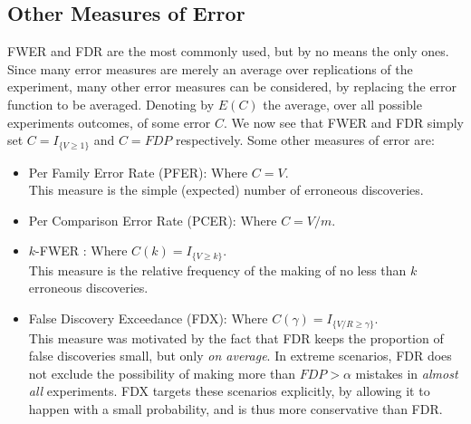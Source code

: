 \documentclass[review,12pt]{article}
\begin{document}
\subsection{\label{sec:other_measures}Other Measures of Error}
FWER and FDR are the most commonly used, but by no means the only ones. Since many error measures are merely an average over replications of the experiment, many other error measures can be considered, by replacing the error function to be averaged. Denoting by $E(C)$ the average, over all possible experiments outcomes, of some error $C$. We now see that FWER and FDR simply set  $C = I_{\{ V \geq 1 \} } $ and $C = FDP$ respectively.
Some other measures of error are:



\begin{itemize}

\item Per Family Error Rate (PFER): Where $C=V$.\\
This measure is the simple (expected) number of erroneous discoveries. 

\item Per Comparison Error Rate (PCER): Where $C=V/m$.

\item $k$-FWER \citep{van_der_laan_augmentation_2004}: Where $C(k) = I_{\{ V \geq k \} }$.\\
This measure is the relative frequency of the making of no less than $k$ erroneous discoveries.

\item False Discovery Exceedance (FDX)\citep{genovese_exceedance_2006}: Where $C(\gamma) = I_{\{ V/R \geq \gamma \} }$.\\
This measure was motivated by the fact that FDR keeps the proportion of false discoveries small, but only \emph{on average}. 
In extreme scenarios, FDR does not exclude the possibility of making more than $FDP>\alpha$ mistakes in \emph{almost all} experiments. FDX targets these scenarios explicitly, by allowing it to happen with a small probability, and is thus more conservative than FDR. 

\end{itemize}
\end{document}
